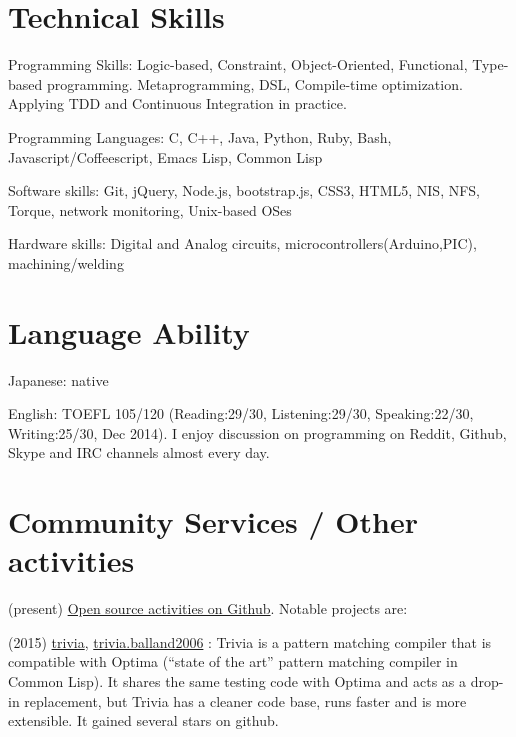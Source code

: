 \documentclass[letterpaper]{article}
\begin{document}
\section{Technical Skills}

\begin{CV}
 \item[Programming Skills:] Logic-based, Constraint, Object-Oriented,
 Functional, Type-based programming. Metaprogramming, DSL,
 Compile-time optimization. Applying TDD and Continuous Integration in practice.
 \item[Programming Languages:] C, C++, Java, Python, Ruby, Bash,
 Javascript/Coffeescript, Emacs Lisp, Common Lisp
 \item[Software skills:] Git, jQuery, Node.js, bootstrap.js, CSS3,
 HTML5, NIS, NFS, Torque, network monitoring, Unix-based OSes
 \item[Hardware skills:] Digital and Analog circuits, microcontrollers(Arduino,PIC), machining/welding
\end{CV}

\section{Language Ability}

\begin{CV}
 \item[Japanese:] native
 \item[English:] TOEFL 105/120 (Reading:29/30, Listening:29/30,
 Speaking:22/30, Writing:25/30, Dec 2014). I enjoy discussion
 on programming on Reddit, Github, Skype and IRC channels almost every day.
\end{CV}

\section{Community Services / Other activities}

(present) \href{https://github.com/guicho271828}{Open source
activities on Github}. Notable projects are:

(2015) \href{https://github.com/guicho271828/trivia}{trivia},
\href{https://github.com/guicho271828/trivia.balland2006}{trivia.balland2006}
: Trivia is a pattern matching compiler that is compatible with Optima
(``state of the art'' pattern matching compiler in Common Lisp). It
shares the same testing code with Optima and acts as a drop-in
replacement, but Trivia has a cleaner code base, runs faster and is
more extensible. It gained several stars on github.
\end{document}
